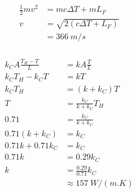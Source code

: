 \documentclass{article}
\begin{document}
\setcounter{subsubsection}{44}
\subsubsection{}

\begin{align*}
  \frac{1}{2} m v^2 & = m c \Delta T + m L_F        \\
  v                 & = \sqrt{2 (c \Delta T + L_F)} \\
                    & = \qty{366}{m/s}
\end{align*}

\setcounter{subsubsection}{54}
\subsubsection{}

\begin{align*}
  k_C A \frac{T_H - T}{L} & = k A \frac{T}{L}          \\
  k_C T_H - k_C T         & = k T                      \\
  k_C T_H                 & = (k + k_C) T              \\
  T                       & = \frac{k_C}{k + k_C} T_H  \\
  0.71                    & = \frac{k_C}{k + k_C}      \\
  0.71 (k + k_C)          & = k_C                      \\
  0.71 k + 0.71 k_C       & = k_C                      \\
  0.71 k                  & = 0.29 k_C                 \\
  k                       & = \frac{0.29}{0.71} k_C    \\
                          & \approx \qty{157}{W/(m.K)}
\end{align*}

\setcounter{subsubsection}{56}
\subsubsection{}
\end{document}
